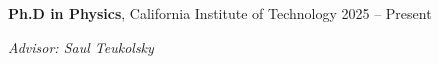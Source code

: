\begin{entry}
	{{\bf Ph.D in Physics}, California Institute of Technology}
	{2025 -- Present}

	{\em Advisor: Saul Teukolsky}
\end{entry}
